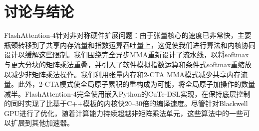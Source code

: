 \section{讨论与结论}
\label{sec:conclusion}

FlashAttention-4针对非对称硬件扩展问题：由于张量核心的速度已非常快，主要瓶颈转移到了共享内存流量和指数运算吞吐量上，这促使我们进行算法和内核协同设计以缓解这些限制。我们围绕完全异步MMA重新设计了流水线，以将softmax与更大分块的矩阵乘法重叠，并引入了软件模拟指数运算和条件式softmax重缩放以减少非矩阵乘法操作。我们利用张量内存和2-CTA MMA模式减少共享内存流量。此外，2-CTA模式使全局原子累积的重构成为可能，将全局原子加操作的数量减半。FlashAttention-4完全使用嵌入Python的CuTe-DSL实现，在保持底层控制的同时实现了比基于C++模板的内核快20--30倍的编译速度。尽管针对Blackwell GPU进行了优化，随着计算能力持续超越非矩阵乘法单元，这些算法中的一些可以扩展到其他加速器。

